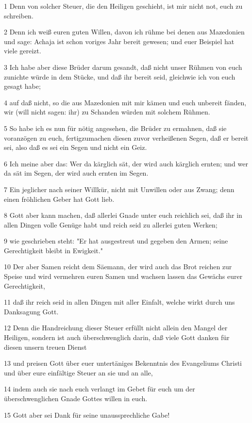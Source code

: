 \par 1 Denn von solcher Steuer, die den Heiligen geschieht, ist mir nicht not, euch zu schreiben.
\par 2 Denn ich weiß euren guten Willen, davon ich rühme bei denen aus Mazedonien und sage: Achaja ist schon voriges Jahr bereit gewesen; und euer Beispiel hat viele gereizt.
\par 3 Ich habe aber diese Brüder darum gesandt, daß nicht unser Rühmen von euch zunichte würde in dem Stücke, und daß ihr bereit seid, gleichwie ich von euch gesagt habe;
\par 4 auf daß nicht, so die aus Mazedonien mit mir kämen und euch unbereit fänden, wir (will nicht sagen: ihr) zu Schanden würden mit solchem Rühmen.
\par 5 So habe ich es nun für nötig angesehen, die Brüder zu ermahnen, daß sie voranzögen zu euch, fertigzumachen diesen zuvor verheißenen Segen, daß er bereit sei, also daß es sei ein Segen und nicht ein Geiz.
\par 6 Ich meine aber das: Wer da kärglich sät, der wird auch kärglich ernten; und wer da sät im Segen, der wird auch ernten im Segen.
\par 7 Ein jeglicher nach seiner Willkür, nicht mit Unwillen oder aus Zwang; denn einen fröhlichen Geber hat Gott lieb.
\par 8 Gott aber kann machen, daß allerlei Gnade unter euch reichlich sei, daß ihr in allen Dingen volle Genüge habt und reich seid zu allerlei guten Werken;
\par 9 wie geschrieben steht: "Er hat ausgestreut und gegeben den Armen; seine Gerechtigkeit bleibt in Ewigkeit."
\par 10 Der aber Samen reicht dem Säemann, der wird auch das Brot reichen zur Speise und wird vermehren euren Samen und wachsen lassen das Gewächs eurer Gerechtigkeit,
\par 11 daß ihr reich seid in allen Dingen mit aller Einfalt, welche wirkt durch uns Danksagung Gott.
\par 12 Denn die Handreichung dieser Steuer erfüllt nicht allein den Mangel der Heiligen, sondern ist auch überschwenglich darin, daß viele Gott danken für diesen unsern treuen Dienst
\par 13 und preisen Gott über euer untertäniges Bekenntnis des Evangeliums Christi und über eure einfältige Steuer an sie und an alle,
\par 14 indem auch sie nach euch verlangt im Gebet für euch um der überschwenglichen Gnade Gottes willen in euch.
\par 15 Gott aber sei Dank für seine unaussprechliche Gabe!

